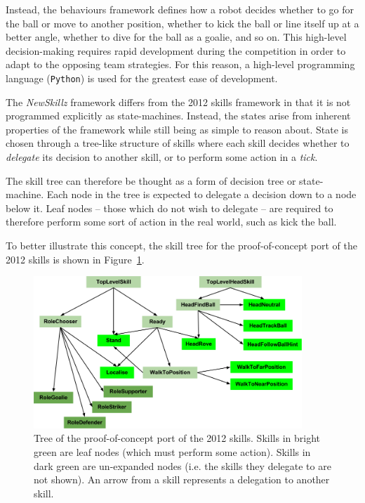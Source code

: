 Instead, the behaviours framework defines how a robot decides whether to go for the ball or move to another position, whether to kick the ball or line itself up at a better angle, whether to dive for the ball as a goalie, and so on. This high-level decision-making requires rapid development during the competition in order to adapt to the opposing team strategies. For this reason, a high-level programming language (\verb!Python!) is used for the greatest ease of development.

The \textit{NewSkillz} framework differs from the 2012 skills framework in that it is not programmed explicitly as state-machines. Instead, the states arise from inherent properties of the framework while still being as simple to reason about. State is chosen through a tree-like structure of skills where each skill decides whether to \textit{delegate} its decision to another skill, or to perform some action in a \textit{tick}.

The skill tree can therefore be thought as a form of decision tree or state-machine. Each node in the tree is expected to delegate a decision down to a node below it. Leaf nodes -- those which do not wish to delegate -- are required to therefore perform some sort of action in the real world, such as kick the ball.

To better illustrate this concept, the skill tree for the proof-of-concept port of the 2012 skills is shown in Figure~\ref{fig:skill_tree}.

\begin{figure}[h]
\centering
\includegraphics[width=0.9\textwidth]{img/skill_tree.png}
\caption{Tree of the proof-of-concept port of the 2012 skills. Skills in bright green are leaf nodes (which must perform some action). Skills in dark green are un-expanded nodes (i.e. the skills they delegate to are not shown). An arrow from a skill represents a delegation to another skill.}
\label{fig:skill_tree}
\end{figure}

